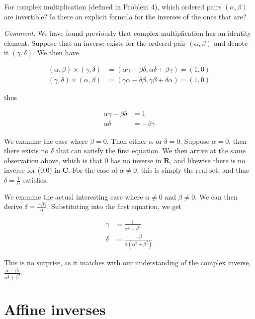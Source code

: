 \begin{problem}
For complex multiplication (defined in Problem 4), which ordered pairs $(\alpha, \beta)$ are invertible? Is there an explicit formula for the inverses of the ones that are?
\end{problem}

\textit{Comment.} We have found previously that complex multiplication has an identity element. Suppose that an inverse exists for the ordered pair $(\alpha, \beta)$ and denote it $(\gamma, \delta)$. We then have

\begin{align}
    (\alpha, \beta) \times (\gamma, \delta) & = (\alpha \gamma - \beta \delta, \alpha \delta + \beta \gamma) = (1,0) \\
    (\gamma, \delta) \times (\alpha, \beta) & = (\gamma\alpha - \delta \beta, \gamma \beta + \delta \alpha) = (1,0)
\end{align}

thus

\begin{align}
    \alpha\gamma - \beta\delta & =  1            \\
    \alpha\delta               & = - \beta\gamma
\end{align}

We examine the case where $\beta = 0$. Then either $\alpha$ or $\delta = 0$. Suppose $\alpha = 0$, then there exists no $\delta$ that can satisfy the first equation. We then arrive at the same observation above, which is that 0 has no inverse in $\mathbf{R}$, and likewise there is no inverse for (0,0) in $\mathbf{C}$. For the case of $\alpha \neq 0$, this is simply the real set, and thus $\delta = \frac{1}{\alpha}$ satisfies.

We examine the actual interesting case where $\alpha \neq 0$ and $\beta \neq 0$. We can then derive $\delta = \frac{-\beta\gamma}{\alpha}$. Substituting into the first equation, we get

\begin{align}
    \gamma & = \frac{1}{\alpha^2 + \beta^2}              \\
    \delta & = \frac{-\beta}{\alpha(\alpha^2 + \beta^2)}
\end{align}

This is no surprise, as it matches with our understanding of the complex inverse, $\frac{\alpha - \beta i}{\alpha^2 + \beta^2}$.

\section{Affine inverses}

